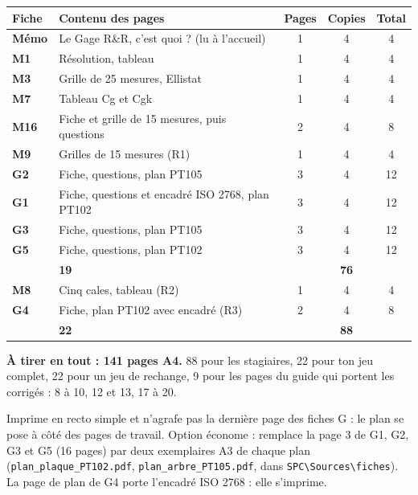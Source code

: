 \documentclass[10pt,a4paper]{article}
\newcommand{\rr}{\cellcolor{orange!14}}
\begin{document}
\renewcommand{\arraystretch}{1.18}\small
\begin{tabularx}{\linewidth}{|>{\bfseries}p{14mm}|>{\raggedright\arraybackslash}X|c|c|c|}\hline
\rowcolor{uimm}\color{white}\textbf{Fiche} & \color{white}\textbf{Contenu des pages} & \color{white}\textbf{Pages} & \color{white}\textbf{Copies} & \color{white}\textbf{Total}\\\hline
Mémo & Le Gage R\&R, c'est quoi ? (lu à l'accueil) & 1 & 4 & 4\\ \hline
M1 & Résolution, tableau & 1 & 4 & 4\\ \hline
M3 & Grille de 25 mesures, Ellistat & 1 & 4 & 4\\ \hline
M7 & Tableau Cg et Cgk & 1 & 4 & 4\\ \hline
M16 & Fiche et grille de 15 mesures, puis questions & 2 & 4 & 8\\ \hline
\rr M9 & Grilles de 15 mesures (R1) & \rr 1 & \rr 4 & \rr 4\\ \hline
G2 & Fiche, questions, plan PT105 & 3 & 4 & 12\\ \hline
G1 & Fiche, questions et encadré ISO 2768, plan PT102 & 3 & 4 & 12\\ \hline
G3 & Fiche, questions, plan PT105 & 3 & 4 & 12\\ \hline
G5 & Fiche, questions, plan PT102 & 3 & 4 & 12\\ \hline
\rowcolor{fond}\multicolumn{2}{|l|}{\textbf{Plan retenu}} & \textbf{19} & & \textbf{76}\\ \hline
\rr M8 & Cinq cales, tableau (R2) & \rr 1 & \rr 4 & \rr 4\\ \hline
\rr G4 & Fiche, plan PT102 avec encadré (R3) & \rr 2 & \rr 4 & \rr 8\\ \hline
\rowcolor{fond}\multicolumn{2}{|l|}{\textbf{Total pour les stagiaires}} & \textbf{22} & & \textbf{88}\\ \hline
\end{tabularx}
\par\smallskip
\textbf{À tirer en tout : 141 pages A4.} 88 pour les stagiaires, 22 pour ton jeu complet, 22 pour un jeu de rechange, 9 pour les pages du guide qui portent les corrigés : 8 à 10, 12 et 13, 17 à 20.

Imprime en recto simple et n'agrafe pas la dernière page des fiches G : le plan se pose à côté des pages de travail. Option économe : remplace la page 3 de G1, G2, G3 et G5 (16 pages) par deux exemplaires A3 de chaque plan (\texttt{plan\_plaque\_PT102.pdf}, \texttt{plan\_arbre\_PT105.pdf}, dans \texttt{SPC\textbackslash Sources\textbackslash fiches}). La page de plan de G4 porte l'encadré ISO 2768 : elle s'imprime.
\end{document}
